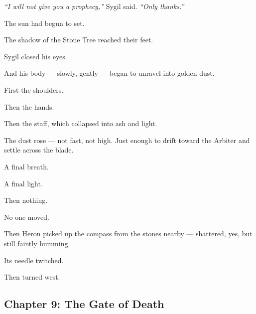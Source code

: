 \documentclass[9pt]{article}
\begin{document}
\textit{“I will not give you a prophecy,”} Sygil said. \textit{“Only thanks.”}

\bigskip

The sun had begun to set.

The shadow of the Stone Tree reached their feet.

Sygil closed his eyes.

And his body — slowly, gently — began to unravel into golden dust.

First the shoulders.

Then the hands.

Then the staff, which collapsed into ash and light.

The dust rose — not fast, not high. Just enough to drift toward the Arbiter and settle across the blade.

A final breath.

A final light.

Then nothing.

\bigskip

No one moved.

Then Heron picked up the compass from the stones nearby — shattered, yes, but still faintly humming.

Its needle twitched.

Then turned west.

\newpage

\subsection*{Chapter 9: The Gate of Death}

\vspace{1in}
\end{document}
